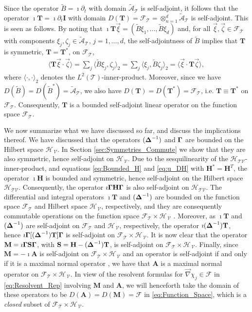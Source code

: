 \documentclass[11pt]{amsart}
\newcommand{\Mb}{\mathbf{M}}
\newcommand{\Tb}{\mathbf{T}}
\newcommand{\Hb}{\mathbf{H}}
\newcommand{\Ib}{\mathbf{I}}
\newcommand{\Sb}{\mathbf{S}}
\newcommand{\Ab}{\mathbf{A}}
\newcommand{\Tc}{\mathcal{T}}
\newcommand{\Vc}{\mathcal{V}}
\newcommand{\Hs}{\mathscr{H}}
\newcommand{\As}{\mathscr{A}}
\newcommand{\Fs}{\mathscr{F}}
\newcommand\bDelta{\mbox{\boldmath${\Delta}$}}
\newcommand\bGamma{\mbox{\boldmath${\Gamma}$}}
\begin{document}
Since the operator $\tilde{B}=\imath\partial_t$ with domain $\tilde{\As}_{\Tc}$ is
self-adjoint, it follows that the operator $\imath\Tb=\imath\partial_t\Ib$ with domain
$D(\Tb)=\Fs_{\Tc}=\otimes_{n=1}^d\tilde{\As}_{\Tc}$ is self-adjoint. This is
seen as follows. By noting that
$\imath\Tb\vec{\xi}=(\tilde{B}\xi_1,\ldots,\tilde{B}\xi_d)$ and, for all 
$\vec{\xi},\vec{\zeta}\in\Fs_{\Tc}$ with components
$\xi_j,\zeta_j\in\tilde{\As}_{\Tc}$, $j=1,\ldots,d$, the self-adjointness of 
$\tilde{B}$ implies that $\Tb$ is symmetric, $\Tb=\Tb^*$, on $\Fs_{\Tc}$, 
%
\begin{align}\label{eq:T_symmetric}
  \langle\Tb\vec{\xi}\cdot\vec{\zeta}\rangle=\sum_j\langle\tilde{B}\xi_j,\zeta_j\rangle_2
                    =\sum_j\langle\xi_j,\tilde{B}\zeta_j\rangle_2
                    =\langle\vec{\xi}\cdot\Tb\vec{\zeta}\rangle,
\end{align}
%
where $\langle\cdot,\cdot\rangle_2$ denotes the $L^2(\Tc)$-inner-product.  Moreover, since we have
$D(\tilde{B})=D(\tilde{B}^*)=\tilde{\As}_{\Tc}$, we also have
$D(\Tb)=D(\Tb^*)=\Fs_{\Tc}$, i.e. $\Tb\equiv\Tb^*$ on
$\Fs_{\Tc}$. Consequently, $\Tb$ is a bounded self-adjoint linear
operator on the function space $\Fs_{\Tc}$.



We now summarize what we have discussed so far, and
discuss the implications thereof. We have discussed that the 
operators $(\bDelta^{-1})$ and $\bGamma$ are bounded on the Hilbert
space $\Hs_{\,\Vc}$. In Section \ref{sec:Symmetries_Commute} we show
that they are also symmetric, hence self-adjoint on $\Hs_{\,\Vc}$. Due
to the sesquilinearity of the $\Hs_{\Tc\Vc}$-inner-product, and
equations \eqref{eq:Bounded_H} and \eqref{eq:u_DH} with $\Hb^*=\Hb^T$,
the  operator $\imath\Hb$ is bounded and symmetric, hence self-adjoint on
the Hilbert space $\Hs_{\Tc\Vc}$.  Consequently, the operator
$\imath\bGamma\Hb\bGamma$ is also self-adjoint on $\Hs_{\Tc\Vc}$. The
differential and integral operators $\imath\Tb$ and $(\bDelta^{-1})$ are 
bounded on the function space $\Fs_{\Tc}$ and Hilbert space $\Hs_{\,\Vc}$,
respectively, and they are consequently commutable operations on the
function space $\Fs_{\Tc}\times\Hs_{\,\Vc}$ \cite{Folland:99}. Moreover, as
$\imath\Tb$ and $(\bDelta^{-1})$ are self-adjoint on
$\Fs_{\Tc}$ and $\Hs_{\,\Vc}$, respectively, the operator 
$\imath(\bDelta^{-1})\Tb$, hence $\imath\bGamma[(\bDelta^{-1})\Tb]\bGamma$ is
self-adjoint on $\Fs_{\Tc}\times\Hs_{\,\Vc}$. It is now clear that the operator
$\Mb=\imath\bGamma\Sb\bGamma$, with $\Sb=\Hb-(\bDelta^{-1})\Tb$, is
self-adjoint on $\Fs_{\Tc}\times\Hs_{\,\Vc}$. Finally, since $\Mb=-\imath\Ab$ is
self-adjoint on $\Fs_{\Tc}\times\Hs_{\,\Vc}$ and an operator is
self-adjoint if and only if it is a maximal normal operator
\cite{Stone:64}, we have that $\Ab$ is a maximal normal
operator on $\Fs_{\Tc}\times\Hs_{\,\Vc}$. In view of the resolvent
formulas for $\vec{\nabla}\chi_j\in\Fs$ in \eqref{eq:Resolvent_Rep}
involving $\Mb$ and $\Ab$, we will henceforth take the domain of
these operators to be $D(\Ab)=D(\Mb)=\Fs$ in
\eqref{eq:Function_Space}, which is a \emph{closed} subset of
$\Fs_{\Tc}\times\Hs_{\,\Vc}$.   
\end{document}
